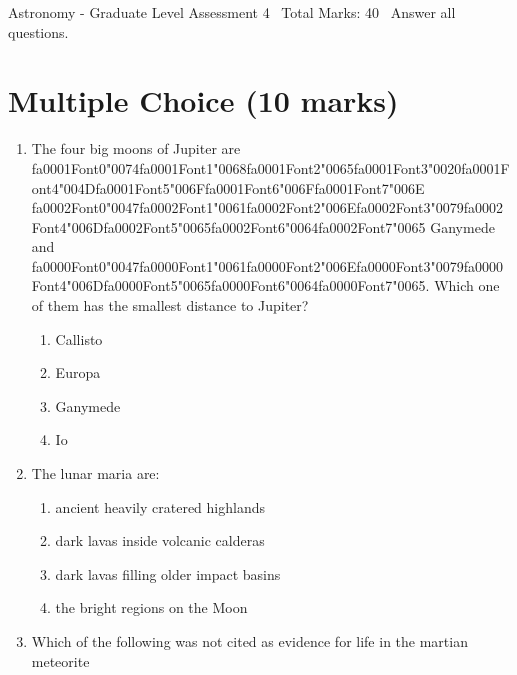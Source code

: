 \documentclass[12pt]{article}
\begin{document}
\begin{center}
Astronomy - Graduate Level Assessment 4 \
Total Marks: 40 \
Answer all questions.
\end{center}

\section*{Multiple Choice (10 marks)}
\begin{enumerate}[label=\arabic*.]
\item The four big moons of Jupiter are {\csname fa0001Font0\endcsname\char"0074}{\csname fa0001Font1\endcsname\char"0068}{\csname fa0001Font2\endcsname\char"0065}{\csname fa0001Font3\endcsname\char"0020}{\csname fa0001Font4\endcsname\char"004D}{\csname fa0001Font5\endcsname\char"006F}{\csname fa0001Font6\endcsname\char"006F}{\csname fa0001Font7\endcsname\char"006E} {\csname fa0002Font0\endcsname\char"0047}{\csname fa0002Font1\endcsname\char"0061}{\csname fa0002Font2\endcsname\char"006E}{\csname fa0002Font3\endcsname\char"0079}{\csname fa0002Font4\endcsname\char"006D}{\csname fa0002Font5\endcsname\char"0065}{\csname fa0002Font6\endcsname\char"0064}{\csname fa0002Font7\endcsname\char"0065} Ganymede and {\csname fa0000Font0\endcsname\char"0047}{\csname fa0000Font1\endcsname\char"0061}{\csname fa0000Font2\endcsname\char"006E}{\csname fa0000Font3\endcsname\char"0079}{\csname fa0000Font4\endcsname\char"006D}{\csname fa0000Font5\endcsname\char"0065}{\csname fa0000Font6\endcsname\char"0064}{\csname fa0000Font7\endcsname\char"0065}. Which one of them has
the smallest distance to Jupiter?
\begin{enumerate}[label=(\alph*)]
    \item Callisto
    \item Europa
    \item Ganymede
    \item Io
\end{enumerate}
\item The lunar maria are:
\begin{enumerate}[label=(\alph*)]
    \item ancient heavily cratered highlands
    \item dark lavas inside volcanic calderas
    \item dark lavas filling older impact basins
    \item the bright regions on the Moon
\end{enumerate}
\item Which of the following was not cited as evidence for life in the martian meteorite

\end{enumerate}
\end{document}
